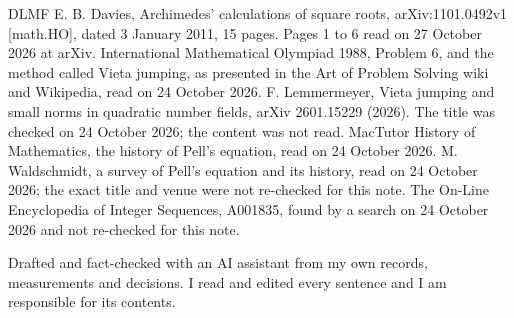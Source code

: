 \documentclass[11pt]{article}
\begin{document}
{\begin{thebibliography}{DLMF}
 E. B. Davies, Archimedes' calculations of square roots, arXiv:1101.0492v1 [math.HO], dated 3 January 2011, 15 pages. Pages 1 to 6 read on 27 October 2026 at arXiv.
 International Mathematical Olympiad 1988, Problem 6, and the method called Vieta jumping, as presented in the Art of Problem Solving wiki and Wikipedia, read on 24 October 2026.
 F. Lemmermeyer, Vieta jumping and small norms in quadratic number fields, arXiv 2601.15229 (2026). The title was checked on 24 October 2026; the content was not read.
 MacTutor History of Mathematics, the history of Pell's equation, read on 24 October 2026.
 M. Waldschmidt, a survey of Pell's equation and its history, read on 24 October 2026; the exact title and venue were not re-checked for this note.
 The On-Line Encyclopedia of Integer Sequences, A001835, found by a search on 24 October 2026 and not re-checked for this note.
\end{thebibliography}
\par}

\bigskip
\noindent Drafted and fact-checked with an AI assistant from my own records, measurements and decisions. I read and edited every sentence and I am responsible for its contents.
\end{document}

